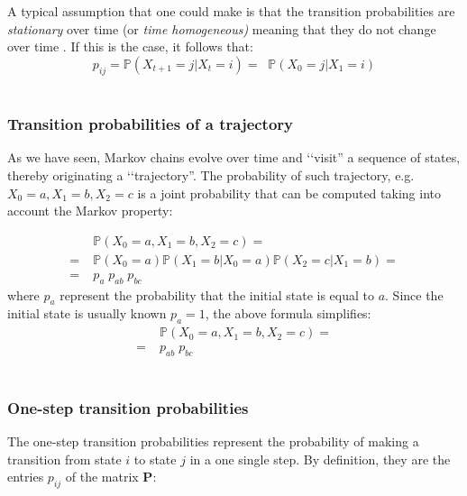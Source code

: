 \documentclass[\main/main.tex]{subfiles}
\begin{document}
A typical assumption that one could make is that the transition probabilities are \textit{stationary} over time (or \textit{time homogeneous)} meaning that they do not change over time \citep{Sheskin2010}. If this is the case, it follows that:
\begin{equation}
    p_{ij} = \mathds{P}(X_{t+1} = j |X_t = i)  = \; \; \mathds{P}(X_{0} = j |X_1 = i)
\end{equation}\\


\subsubsection{Transition probabilities of a trajectory}

\noindent As we have seen, Markov chains evolve over time and \lq\lq visit'' a sequence of states, thereby originating a \lq\lq trajectory''. The probability of such trajectory, e.g. $X_0 = a, X_1 = b, X_2 = c$ is a joint probability that can be computed taking into account the Markov property:

\begin{equation}
\begin{split}
   &\mathds{P}(X_0 = a, X_1 = b, X_2 = c) =\\
   =\;  &\mathds{P}(X_0 = a) \mathds{P}(X_1 = b |X_0 = a ) \mathds{P}(X_2 = c |X_1 = b ) = \\
   =\; &p_a \; p_{ab}\; p_{bc}
\end{split}
\end{equation}
where $p_a$ represent the probability that the initial state is equal to $a$. Since the initial state is usually known $p_a = 1$, the above formula simplifies:
\begin{equation}
\begin{split}
   &\mathds{P}(X_0 = a, X_1 = b, X_2 = c) =\\
   =\; &p_{ab}\; p_{bc}
\end{split}
\end{equation}\\


\subsubsection{One-step transition probabilities}
\noindent The one-step transition probabilities represent the probability of making a transition from state $i$ to state $j$ in a one single step. By definition, they are the entries $p_{ij}$ of the matrix $\mathbf{P}$:
\end{document}
